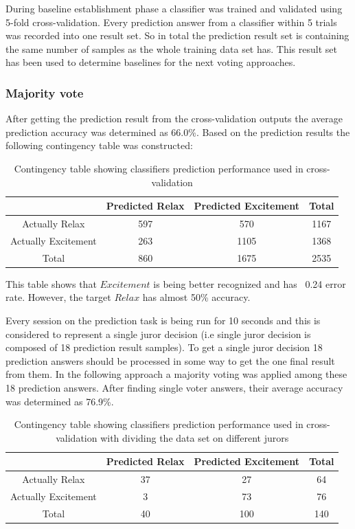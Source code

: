 \documentclass[12pt]{article}
\begin{document}
During baseline establishment phase a classifier was trained and validated using 5-fold cross-validation. Every prediction answer from a classifier within 5 trials was recorded into one result set. So in total the prediction result set is containing the same number of samples as the whole training data set has. This result set has been used to determine baselines for the next voting approaches.

\subsubsection{Majority vote}
After getting the prediction result from the cross-validation outputs the average prediction accuracy was determined as 66.0\%. Based on the prediction results the following contingency table was constructed:
\begin{table}[H]
\caption{Contingency table showing classifiers prediction performance used in cross-validation} \label{tab:title} 
\begin{center}
  \begin{tabular}{ | c | c | c | c | }
    \hline
     & Predicted Relax & Predicted Excitement & Total \\ \hline
    Actually Relax & 597 & 570 & 1167 \\ \hline
    Actually Excitement & 263 & 1105 & 1368 \\ \hline
    Total & 860 & 1675 & 2535 \\ 
    \hline
  \end{tabular}
\end{center}
\end{table}

This table shows that $Excitement$ is being better recognized and has ~0.24 error rate. However, the target $Relax$ has almost 50\% accuracy.

Every session on the prediction task is being run for 10 seconds and this is considered to represent a single juror decision (i.e single juror decision is composed of 18 prediction result samples). To get a single juror decision 18 prediction answers should be processed in some way to get the one final result from them. In the following approach a majority voting was applied among these 18 prediction answers. After finding single voter answers, their average accuracy was determined as 76.9\%.

\begin{table}[H]
\caption{Contingency table showing classifiers prediction performance used in cross-validation with dividing the data set on different jurors} \label{tab:title} 
\begin{center}
  \begin{tabular}{ | c | c | c | c | }
    \hline
     & Predicted Relax & Predicted Excitement & Total \\ \hline
    Actually Relax & 37 & 27 & 64 \\ \hline
    Actually Excitement & 3 & 73 & 76 \\ \hline
    Total & 40 & 100 & 140 \\ 
    \hline
  \end{tabular}
\end{center}
\end{table}
\end{document}
